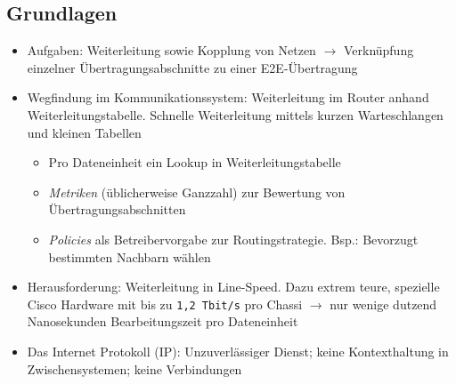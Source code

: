 \subsection{Grundlagen}
\begin{itemize}
	\item Aufgaben: Weiterleitung sowie Kopplung von Netzen \(\rightarrow\) Verknüpfung einzelner Übertragungsabschnitte zu einer E2E-Übertragung
	\item Wegfindung im Kommunikationssystem: Weiterleitung im Router anhand Weiterleitungstabelle. Schnelle Weiterleitung mittels kurzen Warteschlangen und kleinen Tabellen
	\begin{itemize}
		\item Pro Dateneinheit ein Lookup in Weiterleitungstabelle
		\item \textit{Metriken} (üblicherweise Ganzzahl) zur Bewertung von Übertragungsabschnitten
		\item \textit{Policies} als Betreibervorgabe zur Routingstrategie. Bsp.: Bevorzugt bestimmten Nachbarn wählen
	\end{itemize}
	\item Herausforderung: Weiterleitung in Line-Speed. Dazu extrem teure, spezielle Cisco Hardware mit bis zu \texttt{1,2 Tbit/s} pro Chassi \(\rightarrow\) nur wenige dutzend Nanosekunden Bearbeitungszeit pro Dateneinheit
	\item Das Internet Protokoll (IP): Unzuverlässiger Dienst; keine Kontexthaltung in Zwischensystemen; keine Verbindungen
\end{itemize}

